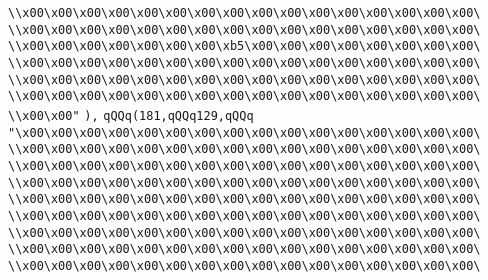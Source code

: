 \verb|\\x00\x00\x00\x00\x00\x00\x00\x00\x00\x00\x00\x00\x00\x00\x00\x00\|\newline
\verb|\\x00\x00\x00\x00\x00\x00\x00\x00\x00\x00\x00\x00\x00\x00\x00\x00\|\newline
\verb|\\x00\x00\x00\x00\x00\x00\x00\xb5\x00\x00\x00\x00\x00\x00\x00\x00\|\newline
\verb|\\x00\x00\x00\x00\x00\x00\x00\x00\x00\x00\x00\x00\x00\x00\x00\x00\|\newline
\verb|\\x00\x00\x00\x00\x00\x00\x00\x00\x00\x00\x00\x00\x00\x00\x00\x00\|\newline
\verb|\\x00\x00\x00\x00\x00\x00\x00\x00\x00\x00\x00\x00\x00\x00\x00\x00\|\newline
\verb|\\x00\x00"|\newline
\verb|),|\newline
\verb|qQQq(181,qQQq129,qQQq|\newline
\verb|"\x00\x00\x00\x00\x00\x00\x00\x00\x00\x00\x00\x00\x00\x00\x00\x00\|\newline
\verb|\\x00\x00\x00\x00\x00\x00\x00\x00\x00\x00\x00\x00\x00\x00\x00\x00\|\newline
\verb|\\x00\x00\x00\x00\x00\x00\x00\x00\x00\x00\x00\x00\x00\x00\x00\x00\|\newline
\verb|\\x00\x00\x00\x00\x00\x00\x00\x00\x00\x00\x00\x00\x00\x00\x00\x00\|\newline
\verb|\\x00\x00\x00\x00\x00\x00\x00\x00\x00\x00\x00\x00\x00\x00\x00\x00\|\newline
\verb|\\x00\x00\x00\x00\x00\x00\x00\x00\x00\x00\x00\x00\x00\x00\x00\x00\|\newline
\verb|\\x00\x00\x00\x00\x00\x00\x00\x00\x00\x00\x00\x00\x00\x00\x00\x00\|\newline
\verb|\\x00\x00\x00\x00\x00\x00\x00\x00\x00\x00\x00\x00\x00\x00\x00\x00\|\newline
\verb|\\x00\x00\x00\x00\x00\x00\x00\x00\x00\x00\x00\x00\x00\x00\x00\x00\|\newline
